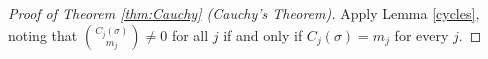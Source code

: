 \begin{proof}[Proof of Theorem \ref{thm:Cauchy} (Cauchy's Theorem)] 
Apply Lemma \ref{cycles}, noting that $\binom{C_j(\sigma)}{m_j}\ne 0$
for all $j$ if and only if $C_j(\sigma)=m_j$ for every $j$.
\end{proof}
